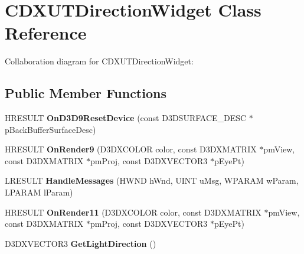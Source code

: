 \hypertarget{class_c_d_x_u_t_direction_widget}{\section{C\+D\+X\+U\+T\+Direction\+Widget Class Reference}
\label{class_c_d_x_u_t_direction_widget}
}


Collaboration diagram for C\+D\+X\+U\+T\+Direction\+Widget\+:
\subsection*{Public Member Functions}
\begin{DoxyCompactItemize}
\item 
\hypertarget{class_c_d_x_u_t_direction_widget_a74f7b9ebd8c16ee2ab2d978968b90678}{H\+R\+E\+S\+U\+L\+T {\bfseries On\+D3\+D9\+Reset\+Device} (const D3\+D\+S\+U\+R\+F\+A\+C\+E\+\_\+\+D\+E\+S\+C $\ast$p\+Back\+Buffer\+Surface\+Desc)}\label{class_c_d_x_u_t_direction_widget_a74f7b9ebd8c16ee2ab2d978968b90678}

\item 
\hypertarget{class_c_d_x_u_t_direction_widget_a3393973d4d9764916e4cd2815d55aa7f}{H\+R\+E\+S\+U\+L\+T {\bfseries On\+Render9} (D3\+D\+X\+C\+O\+L\+O\+R color, const D3\+D\+X\+M\+A\+T\+R\+I\+X $\ast$pm\+View, const D3\+D\+X\+M\+A\+T\+R\+I\+X $\ast$pm\+Proj, const D3\+D\+X\+V\+E\+C\+T\+O\+R3 $\ast$p\+Eye\+Pt)}\label{class_c_d_x_u_t_direction_widget_a3393973d4d9764916e4cd2815d55aa7f}

\item 
\hypertarget{class_c_d_x_u_t_direction_widget_aa31062654d6963e8c763626b2413e2c4}{L\+R\+E\+S\+U\+L\+T {\bfseries Handle\+Messages} (H\+W\+N\+D h\+Wnd, U\+I\+N\+T u\+Msg, W\+P\+A\+R\+A\+M w\+Param, L\+P\+A\+R\+A\+M l\+Param)}\label{class_c_d_x_u_t_direction_widget_aa31062654d6963e8c763626b2413e2c4}

\item 
\hypertarget{class_c_d_x_u_t_direction_widget_a523abc37afb2544a9dbcabd317a95855}{H\+R\+E\+S\+U\+L\+T {\bfseries On\+Render11} (D3\+D\+X\+C\+O\+L\+O\+R color, const D3\+D\+X\+M\+A\+T\+R\+I\+X $\ast$pm\+View, const D3\+D\+X\+M\+A\+T\+R\+I\+X $\ast$pm\+Proj, const D3\+D\+X\+V\+E\+C\+T\+O\+R3 $\ast$p\+Eye\+Pt)}\label{class_c_d_x_u_t_direction_widget_a523abc37afb2544a9dbcabd317a95855}

\item 
\hypertarget{class_c_d_x_u_t_direction_widget_ad9b37b2fd57967a6284cb56abe1c5e3a}{D3\+D\+X\+V\+E\+C\+T\+O\+R3 {\bfseries Get\+Light\+Direction} ()}\label{class_c_d_x_u_t_direction_widget_ad9b37b2fd57967a6284cb56abe1c5e3a}


\end{DoxyCompactItemize}
